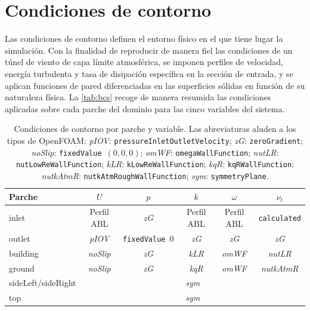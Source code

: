 
\section{Condiciones de contorno}
\label{sec:bcs}

Las condiciones de contorno definen el entorno físico en el que tiene lugar la simulación. Con la finalidad de reproducir de manera fiel las condiciones de un túnel de viento de capa límite atmosférica, se imponen perfiles de velocidad, energía turbulenta y tasa de disipación específica en la sección de entrada, y se aplican funciones de pared diferenciadas en las superficies sólidas en función de su naturaleza física. La \autoref{tab:bcs} recoge de manera resumida las condiciones aplicadas sobre cada parche del dominio para las cinco variables del sistema.

\begin{table}[htbp]
\centering
\caption{Condiciones de contorno por parche y variable. Las abreviaturas aluden a los tipos de OpenFOAM: \textit{pIOV}: \texttt{pressureInletOutletVelocity}; \textit{zG}: \texttt{zeroGradient}; \textit{noSlip}: \texttt{fixedValue}~$(0,0,0)$; \textit{omWF}: \texttt{omegaWallFunction}; \textit{nutLR}: \texttt{nutLowReWallFunction}; \textit{kLR}: \texttt{kLowReWallFunction}; \textit{kqR}: \texttt{kqRWallFunction}; \textit{nutkAtmR}: \texttt{nutkAtmRoughWallFunction}; \textit{sym}: \texttt{symmetryPlane}.}
\label{tab:bcs}
\small
\setlength{\tabcolsep}{5pt}
\begin{tabular}{lccccc}
\toprule
Parche & $U$ & $p$ & $k$ & $\omega$ & $\nu_t$ \\
\midrule
inlet              & Perfil ABL       & \textit{zG}             & Perfil ABL    & Perfil ABL    & \texttt{calculated} \\
outlet             & \textit{pIOV}    & \texttt{fixedValue}~$0$ & \textit{zG}   & \textit{zG}   & \textit{zG}  \\
building           & \textit{noSlip}  & \textit{zG}             & \textit{kLR}  & \textit{omWF} & \textit{nutLR}    \\
ground             & \textit{noSlip}  & \textit{zG}             & \textit{kqR}  & \textit{omWF} & \textit{nutkAtmR} \\
sideLeft/sideRight & \multicolumn{5}{c}{\textit{sym}} \\
top                & \multicolumn{5}{c}{\textit{sym}} \\
\bottomrule
\end{tabular}
\end{table}

